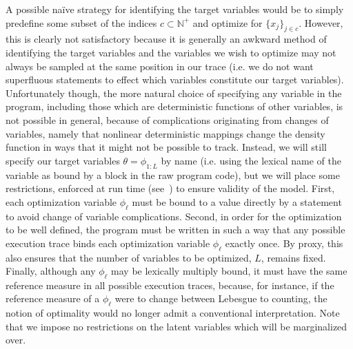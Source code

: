 A possible na\"{i}ve strategy for identifying the target variables
would be to simply predefine some subset of the \sample indices
$c \subset \mathbb{N}^+$ and optimize for $\{x_j \}_{j\in c}$.  However, this is clearly not satisfactory
because it is generally an awkward method of identifying the target variables and the variables we wish
to optimize may not always be sampled at the same position in our trace (i.e. we do not want superfluous
\sample statements to effect which variables constitute our target variables).
Unfortunately though, the more natural choice of specifying any variable in the program, including those
which are deterministic functions of other variables, is not possible in general, because of complications
originating from changes of variables, namely that nonlinear deterministic mappings change the density
function in ways that it might not be possible to track.  Instead, we will still specify our target variables
$\theta = \phi_{1:L}$ by name (i.e. using the lexical name of the variable as bound by a  block in
the raw program code), but we will place some restrictions, enforced at run time (see~\cite{rainforth2017boppArxiv})
to ensure validity of the model.  First, each optimization variable $\phi_{\ell}$ must be bound to a value directly 
by a \sample statement to avoid change of variable complications.
Second, in order for the optimization to be well defined, the program must be written in such a way that any 
possible execution trace binds each optimization variable $\phi_{\ell}$ exactly once.  By proxy, this also
ensures that the number of variables to be optimized, $L$, remains fixed.
Finally, although any $\phi_{\ell}$ may be lexically multiply bound, it must have the same reference 
measure in all possible execution traces, because, for instance, if the reference measure of 
a $\phi_{\ell}$ were to change between Lebesgue to counting, the notion of optimality would 
no longer admit a conventional interpretation.  Note that we impose no restrictions on the latent
variables which will be marginalized over.

